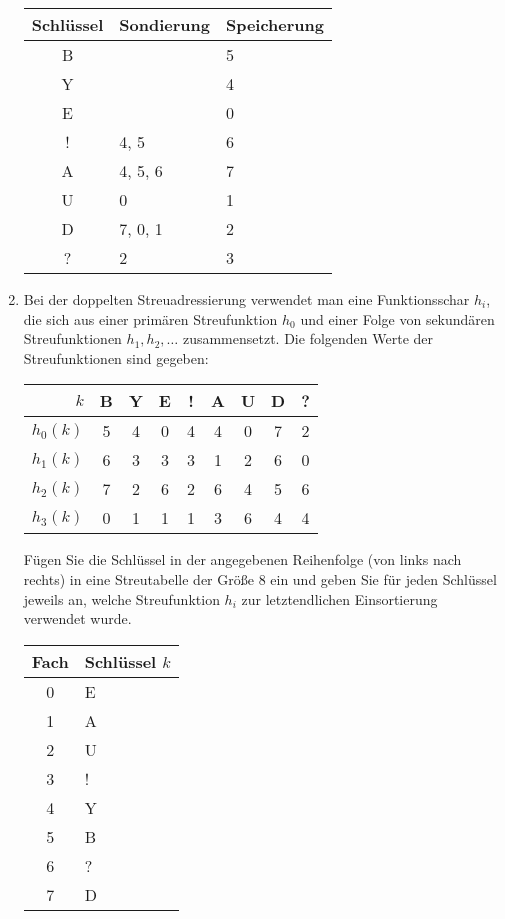 \documentclass{bschlangaul-aufgabe}
\begin{document}
\begin{enumerate}
\begin{bAntwort}
\begin{center}
\begin{tabular}{|c||l|l|}
\hline
Schlüssel & Sondierung & Speicherung\\
\hline
B & & 5 \\
Y & & 4 \\
E & & 0 \\
! & 4, 5 & 6 \\
A & 4, 5, 6 & 7 \\
U & 0 & 1 \\
D & 7, 0, 1 & 2 \\
? & 2 & 3 \\
\hline
\end{tabular}
\end{center}
\end{bAntwort}


\item Bei der doppelten Streuadressierung verwendet man eine
Funktionsschar $h_i$, die sich aus einer primären Streufunktion $h_0$
und einer Folge von sekundären Streufunktionen $h_1, h_2,\dots$
zusammensetzt. Die folgenden Werte der Streufunktionen sind gegeben:

\begin{center}
\begin{tabular}{|r||c|c|c|c|c|c|c|c|}
\hline
$k$      & B & Y & E & ! & A & U & D & ? \\\hline
$h_0(k)$ & 5 & 4 & 0 & 4 & 4 & 0 & 7 & 2 \\\hline
$h_1(k)$ & 6 & 3 & 3 & 3 & 1 & 2 & 6 & 0 \\\hline
$h_2(k)$ & 7 & 2 & 6 & 2 & 6 & 4 & 5 & 6 \\\hline
$h_3(k)$ & 0 & 1 & 1 & 1 & 3 & 6 & 4 & 4 \\\hline
\end{tabular}
\end{center}

Fügen Sie die Schlüssel in der angegebenen Reihenfolge (von links nach
rechts) in eine Streutabelle der Größe $8$ ein und geben Sie für jeden
Schlüssel jeweils an, welche Streufunktion $h_i$ zur letztendlichen
Einsortierung verwendet wurde.

\begin{bAntwort}
\begin{center}
\begin{tabular}{|c||l|}
\hline
Fach & Schlüssel $k$\\
\hline
0 & E \\
1 & A \\
2 & U \\
3 & ! \\
4 & Y \\
5 & B \\
6 & ? \\
7 & D \\
\hline
\end{tabular}
\end{center}


\end{bAntwort}
\end{enumerate}
\end{document}
